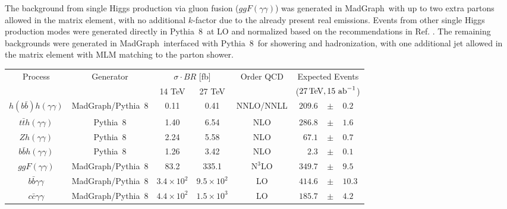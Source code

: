 The background from single Higgs production via gluon fusion ($ggF(\gamma\gamma)$) was generated in {\sc\small MadGraph}\ with up to two extra partons allowed in the matrix element, with no additional $k$-factor due to the already present real emissions. Events from other single Higgs production modes were generated directly in {\sc\small Pythia~8}\ at LO and normalized based on the recommendations in Ref. \cite{DeFlorian:2016spz}. The remaining backgrounds were generated in {\sc\small MadGraph}\ interfaced with {\sc\small Pythia~8}\ for showering and hadronization, with one additional jet allowed in the matrix element with MLM matching \cite{Mangano:2006rw, Alwall:2007fs} to the parton shower.

\begingroup
\renewcommand*{\arraystretch}{.7}
\begin{table}
\centering
\begin{tabular}{|c|c|cc|c|rcl|}
\hline
\multirow{2}{*}{Process}     & \multirow{2}{*}{Generator} & \multicolumn{2}{c|}{$\sigma \cdot BR$ {[}fb{]}} & \multirow{2}{*}{Order QCD} & \multicolumn{3}{c|}{Expected Events} \\
                              			&                   							& 14 TeV  			& 27 TeV  			&		& \multicolumn{3}{c|}{($27\, {\rm TeV}, 15~\text{ab}^{-1}$)} \\ \hline
$h(b\bar{b})h(\gamma\gamma)$  	& {\sc\small MadGraph}/{\sc\small Pythia~8} 	& 0.11      			& 0.41      			& NNLO/NNLL								& $209.6$		& $\pm$ & $0.2$ \\ \hline
$t\bar{t}h(\gamma\gamma)$     		& {\sc\small Pythia~8}           			& 1.40      			& 6.54      			& NLO  										& $286.8$		& $\pm$ & $1.6$\\
$Zh(\gamma\gamma)$            		& {\sc\small Pythia~8}           			& 2.24      			& 5.58      			& NLO 											& $67.1$ 		& $\pm$ & $0.7$ \\
$b\bar{b}h(\gamma\gamma)$     	& {\sc\small Pythia~8}           			& 1.26      			& 3.42      			& NLO 											& $2.3$ 		& $\pm$ & $0.1$ \\
$ggF(\gamma\gamma)$           		& {\sc\small MadGraph}/{\sc\small Pythia~8} 	& 83.2      			& 335.1     		& $\text{N}^{3}\text{LO}$ 				& $349.7$ 	& $\pm$ & $9.5$ \\ \hline
$b\bar{b}\gamma\gamma$        	& {\sc\small MadGraph}/{\sc\small Pythia~8} 	& $3.4\times 10^{2}$     & $9.5\times 10^{2}$     & LO 					& $414.6$ 	& $\pm$ & $10.3$ \\
$c\bar{c}\gamma\gamma$        		& {\sc\small MadGraph}/{\sc\small Pythia~8} 	& $4.4\times 10^{2}$     & $1.5\times 10^{3}$     & LO 					& $185.7$ 	& $\pm$ & $4.2$ \\

\end{tabular}
\end{table}
